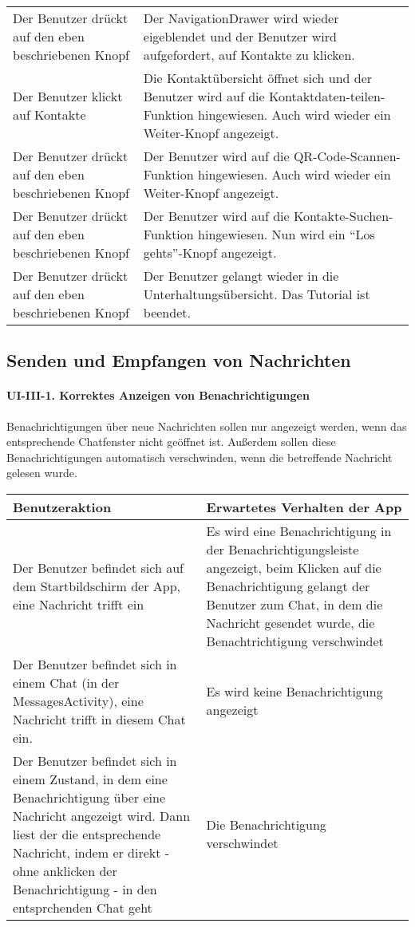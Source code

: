 \begin{longtable}{|p{8cm}|p{8.5cm}|}
Der Benutzer drückt auf den eben beschriebenen Knopf & Der
NavigationDrawer wird wieder eigeblendet und der Benutzer wird
aufgefordert, auf Kontakte zu klicken.\tabularnewline
Der Benutzer klickt auf Kontakte & Die Kontaktübersicht öffnet sich und
der Benutzer wird auf die Kontaktdaten-teilen-Funktion hingewiesen. Auch
wird wieder ein Weiter-Knopf angezeigt.\tabularnewline
Der Benutzer drückt auf den eben beschriebenen Knopf & Der Benutzer wird
auf die QR-Code-Scannen-Funktion hingewiesen. Auch wird wieder ein
Weiter-Knopf angezeigt.\tabularnewline
Der Benutzer drückt auf den eben beschriebenen Knopf & Der Benutzer wird
auf die Kontakte-Suchen-Funktion hingewiesen. Nun wird ein ``Los
gehts''-Knopf angezeigt.\tabularnewline
Der Benutzer drückt auf den eben beschriebenen Knopf & Der Benutzer
gelangt wieder in die Unterhaltungsübersicht. Das Tutorial ist
beendet.\tabularnewline
\hline
\end{longtable}

\clearpage
\subsection{ Senden und Empfangen von
Nachrichten}\label{iii-senden-und-empfangen-von-nachrichten}

\paragraph{UI-III-1. Korrektes Anzeigen von
Benachrichtigungen}\label{korrektes-anzeigen-von-benachrichtigungen}

Benachrichtigungen über neue Nachrichten sollen nur angezeigt werden,
wenn das entsprechende Chatfenster nicht geöffnet ist. Außerdem sollen
diese Benachrichtigungen automatisch verschwinden, wenn die betreffende
Nachricht gelesen wurde.

\begin{longtable}{|p{8cm}|p{8.5cm}|}
\hline
Benutzeraktion & Erwartetes Verhalten der App\tabularnewline
\hline

Der Benutzer befindet sich auf dem Startbildschirm der App, eine
Nachricht trifft ein & Es wird eine Benachrichtigung in der
Benachrichtigungsleiste angezeigt, beim Klicken auf die Benachrichtigung
gelangt der Benutzer zum Chat, in dem die Nachricht gesendet wurde, die
Benachtrichtigung verschwindet\tabularnewline
Der Benutzer befindet sich in einem Chat (in der MessagesActivity), eine
Nachricht trifft in diesem Chat ein. & Es wird keine Benachrichtigung
angezeigt\tabularnewline
Der Benutzer befindet sich in einem Zustand, in dem eine
Benachrichtigung über eine Nachricht angezeigt wird. Dann liest der die
entsprechende Nachricht, indem er direkt - ohne anklicken der
Benachrichtigung - in den entsprchenden Chat geht & Die Benachrichtigung
verschwindet\tabularnewline
\hline
\end{longtable}

